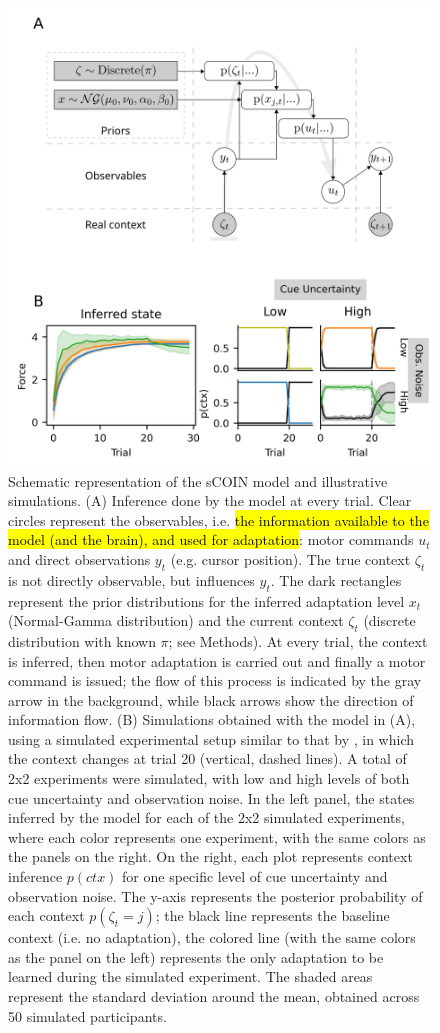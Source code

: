 \documentclass[a4paper,doc,floatsintext,natbib]{apa6}
\DeclareRobustCommand{\newcontent}[1]{\hl{#1}}
\begin{document}
\begin{figure}
\centering
\includegraphics[]{./figures/figure_1.png}
\caption{Schematic representation of the sCOIN model and illustrative simulations. (A) Inference done by the model at every trial. Clear circles represent the observables, i.e. \newcontent{the information available to the model (and the brain), and used for adaptation}: motor commands $u_t$ and direct observations $y_t$ (e.g. cursor position). The true context $\zeta_t$ is not directly observable, but influences $y_t$. The dark rectangles represent the prior distributions for the inferred adaptation level $x_t$ (Normal-Gamma distribution) and the current context $\zeta_t$ (discrete distribution with known $\pi$; see Methods). At every trial, the context is inferred, then motor adaptation is carried out and finally a motor command is issued; the flow of this process is indicated by the gray arrow in the background, while black arrows show the direction of information flow. (B) Simulations obtained with the model in (A), using a simulated experimental setup similar to that by \cite{Davidson_Scaling_2004}, in which the context changes at trial 20 (vertical, dashed lines). A total of 2x2 experiments were simulated, with low and high levels of both cue uncertainty and observation noise. In the left panel, the states inferred by the model for each of the 2x2 simulated experiments, where each color represents one experiment, with the same colors as the panels on the right. On the right, each plot represents context inference $p(ctx)$ for one specific level of cue uncertainty and observation noise. The y-axis represents the posterior probability of each context $p(\zeta_t = j)$; the black line represents the baseline context (i.e. no adaptation), the colored line (with the same colors as the panel on the left) represents the only adaptation to be learned during the simulated experiment. The shaded areas represent the standard deviation around the mean, obtained across 50 simulated participants.}

\end{figure}
\end{document}
